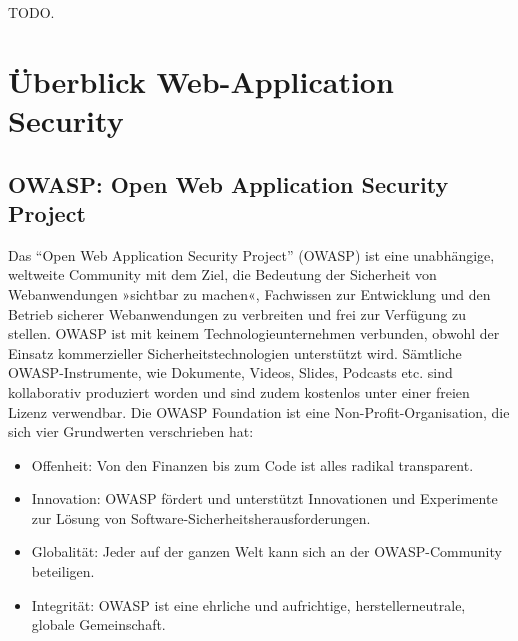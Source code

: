 \documentclass[12pt,oneside,a4paper,parskip]{scrbook}
\begin{document}
TODO. \cite{handbook}

\cite{handbook}

\chapter{Überblick Web-Application Security}

\section{OWASP: Open Web Application Security Project}
Das ``Open Web Application Security Project'' (OWASP) ist eine unabhängige, weltweite Community mit dem Ziel, die Bedeutung der Sicherheit von Webanwendungen »sichtbar zu machen«, Fachwissen zur Entwicklung und den Betrieb sicherer Webanwendungen zu verbreiten und frei zur Verfügung zu stellen.
OWASP ist mit keinem Technologieunternehmen verbunden, obwohl der Einsatz kommerzieller Sicherheitstechnologien unterstützt wird. Sämtliche OWASP-Instrumente, wie Dokumente, Videos, Slides, Podcasts etc. sind kollaborativ produziert worden und sind zudem kostenlos unter einer freien Lizenz verwendbar. Die OWASP Foundation ist eine Non-Profit-Organisation, die sich vier Grundwerten verschrieben hat:

\begin{itemize}
  \item Offenheit: Von den Finanzen bis zum Code ist alles radikal transparent.
  \item Innovation: OWASP fördert und unterstützt Innovationen und Experimente zur Lösung von Software-Sicherheitsherausforderungen.
  \item Globalität: Jeder auf der ganzen Welt kann sich an der OWASP-Community beteiligen.
  \item Integrität: OWASP ist eine ehrliche und aufrichtige, herstellerneutrale, globale Gemeinschaft.
\end{itemize}
\end{document}
